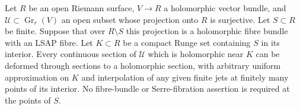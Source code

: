 \begin{lemma}\hypertarget{tag-02O2}{}\label{maps:src:F.3.10}


Let $R$ be an open Riemann surface, $V\to R$ a holomorphic vector
bundle, and $\mathscr U\subset\operatorname{Gr}_r(V)$ an open
subset whose projection onto $R$ is surjective.  Let $S\subset R$
be finite.  Suppose that over $R\setminus S$ this projection is
a holomorphic fibre bundle with an LSAP fibre.  Let $K\subset R$
be a compact Runge set containing $S$ in its interior.
Every continuous section of $\mathscr U$ which is holomorphic
near $K$ can be deformed through sections to a holomorphic
section, with arbitrary uniform approximation on $K$ and
interpolation of any given finite jets at finitely many points
of its interior.  No fibre-bundle or Serre-fibration assertion
is required at the points of $S$.

\end{lemma}


